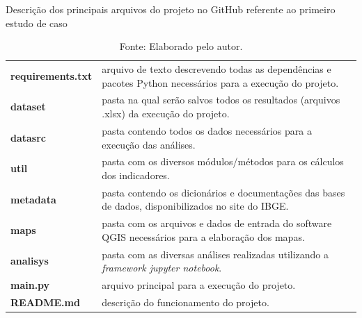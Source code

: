 \begin{table}[h]
    \centering
    \caption{Descrição dos principais arquivos do projeto no GitHub referente ao primeiro estudo de caso} 
    \begin{tabular}{p{}p{}}
    \hline
    \textbf{requirements.txt} & arquivo de texto descrevendo todas as dependências e pacotes Python necessários para a execução do projeto.\vspace{3mm}            \\
    \textbf{dataset}          & pasta na qual serão salvos todos os resultados (arquivos .xlsx) da execução do projeto.\vspace{3mm}                                \\
    \textbf{datasrc}          & pasta contendo todos os dados necessários para a execução das análises.\vspace{3mm}                                                \\
    \textbf{util}             & pasta com os diversos módulos/métodos para os cálculos dos indicadores.\vspace{3mm}                                                \\
    \textbf{metadata}         & pasta contendo os dicionários e documentações das bases de dados, disponibilizados no site do IBGE.\vspace{3mm}                    \\
    \textbf{maps}             & pasta com os arquivos e dados de entrada do software QGIS necessários para a elaboração dos mapas.\vspace{3mm}                     \\
    \textbf{analisys}         & pasta com as diversas análises realizadas utilizando a \textit{framework jupyter notebook}.\vspace{3mm}                                     \\
    \textbf{main.py}          & arquivo principal para a execução do projeto.\vspace{3mm}                                                                          \\
    \textbf{README.md}        & descrição do funcionamento do projeto.
    \\\hline
    \end{tabular}
    \caption*{\footnotesize{Fonte: Elaborado pelo autor.}}
    \label{tab:cap04:github}
\end{table}

